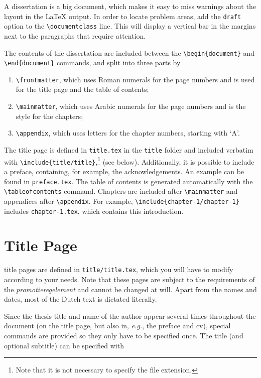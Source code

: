 A dissertation is a big document, which makes it easy to miss warnings about the layout in the \LaTeX{} output. In order to locate problem areas, add the \texttt{draft} option to the \texttt{\textbackslash documentclass} line. This will display a vertical bar in the margins next to the paragraphs that require attention.

The contents of the dissertation are included between the \texttt{\textbackslash begin\{document\}} and \texttt{\textbackslash end\{document\}} commands, and split into three parts by
\begin{enumerate}
\item\texttt{\textbackslash frontmatter}, which uses Roman numerals for the page numbers and is used for the title page and the table of contents;
\item\texttt{\textbackslash mainmatter}, which uses Arabic numerals for the page numbers and is the style for the chapters;
\item\texttt{\textbackslash appendix}, which uses letters for the chapter numbers, starting with `A'.
\end{enumerate}
The title page is defined in \texttt{title.tex} in the \texttt{title} folder and included verbatim with \texttt{\textbackslash include\{title/title\}},\footnote{Note that it is not necessary to specify the file extension.} (see below). Additionally, it is possible to include a preface, containing, for example, the acknowledgements. An example can be found in \texttt{preface.tex}. The table of contents is generated automatically with the \texttt{\textbackslash tableofcontents} command. Chapters are included after \texttt{\textbackslash mainmatter} and appendices after \texttt{\textbackslash appendix}. For example, \texttt{\textbackslash include\{chapter-1/chapter-1\}} includes \texttt{chapter-1.tex}, which contains this introduction.

\section{Title Page}

 title pages are defined in \texttt{title/title.tex}, which you will have to modify according to your needs. Note that these pages are subject to the requirements of the \emph{promotieregelement} and cannot be changed at will. Apart from the names and dates, most of the Dutch text is dictated literally.

Since the thesis title and name of the author appear several times throughout the document (on the title page, but also in, \emph{e.g.}, the preface and cv), special commands are provided so they only have to be specified once. The title (and optional subtitle) can be specified with

